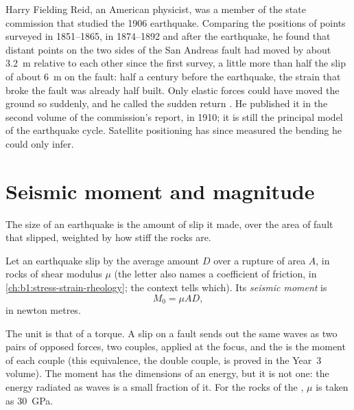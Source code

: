 \begin{history}
Harry Fielding Reid, an American physicist, was a member of the state
commission that studied the 1906 earthquake. Comparing the positions of
points surveyed in 1851--1865, in 1874--1892 and after the earthquake, he
found that distant points on the two sides of the San Andreas fault had moved
by about \qty{3.2}{m} relative to each other since the first survey, a little
more than half the slip of about \qty{6}{m} on the fault: half a century before
the earthquake, the strain that broke the fault was already half built. Only
elastic forces could have moved the ground so suddenly, and he called the
sudden return . He published it in the second volume of the
commission's report, in 1910; it is still the principal model of the
earthquake cycle. Satellite positioning has since measured the bending he
could only infer.
\end{history}

\section{Seismic moment and magnitude}\label{sec:b1:earthquake-source:moment}

The size of an earthquake is the amount of slip it made, over the area of
fault that slipped, weighted by how stiff the rocks are.

\begin{definition}\label{def:b1:earthquake-source:moment}
Let an earthquake slip by the average amount $D$ over a rupture of area $A$,
in rocks of shear modulus $\mu$ (the letter also names a coefficient of friction,
in \cref{ch:b1:stress-strain-rheology}; the context tells which). Its \emph{seismic moment} is
\[
  M_0 = \mu A D ,
\]
in newton metres.
\end{definition}

The unit is that of a torque. A slip on a fault sends out the same waves as two
pairs of opposed forces, two couples, applied at the focus, and the  is the moment of each couple (this equivalence, the double couple, is
proved in the Year~3 volume). The moment has the dimensions of an energy, but
it is not one: the energy radiated as waves is a small fraction of it. For the
rocks of the , $\mu$ is taken as \qty{30}{GPa}.

